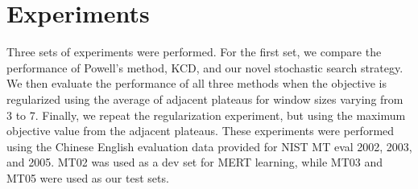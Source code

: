 \documentclass[11pt,tightenlines,kern-1pt]{article}
\begin{document}



\section{Experiments}

Three sets of experiments were performed. For the first set, we compare the performance of Powell's method, KCD, and our novel stochastic search strategy. We then evaluate the performance of all three methods when the objective is regularized using the average of adjacent plateaus for window sizes varying from 3 to 7. Finally, we repeat the regularization experiment, but using the maximum objective value from the adjacent plateaus. These experiments were performed using the Chinese English evaluation data provided for NIST MT eval 2002, 2003, and 2005. MT02 was used as a dev set for MERT learning, while MT03 and MT05 were used as our test sets. 
\end{document}
